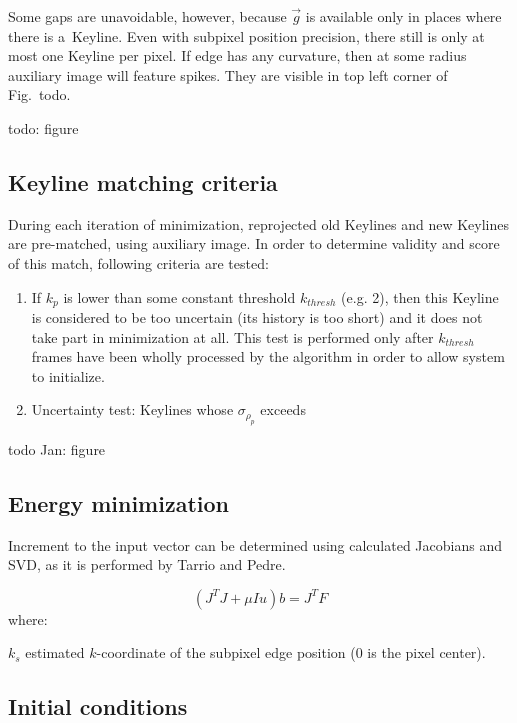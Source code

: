 Some gaps are unavoidable, however, because $\vec{g}$ is available only in places where there is a~Keyline. Even with subpixel position precision, there still is only at most one Keyline per pixel. If edge has any curvature, then at some radius auxiliary image will feature spikes. They are visible in top left corner of Fig.~todo.

todo: figure



\subsection{Keyline matching criteria}

During each iteration of minimization, reprojected old Keylines and new Keylines are pre-matched, using auxiliary image. In order to determine validity and score of this match, following criteria are tested:

\begin{enumerate}
	\item If $k_{p}$ is lower than some constant threshold $k_{thresh}$ (e.g. 2), then this Keyline is considered to be too uncertain (its history is too short) and it does not take part in minimization at all. This test is performed only after $k_{thresh}$ frames have been wholly processed by the algorithm in order to allow system to initialize.
	\item Uncertainty test: Keylines whose $\sigma_{\rho_{p}}$ exceeds 
\end{enumerate}

todo Jan: figure

\subsection{Energy minimization}

Increment to the input vector can be determined using calculated Jacobians and SVD, as it is performed by Tarrio and Pedre. 

\begin{equation}
(J^T J + \mu I u)b = J^T F
\label{eq:jtj}
\end{equation}
where:
\begin{eqwhere}[2cm]
	\item[$k_s$] estimated $k$-coordinate of the subpixel edge position (0 is the pixel center).
\end{eqwhere}

\subsection{Initial conditions}

